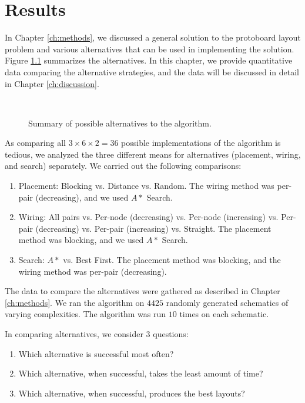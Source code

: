 
\chapter{Results}
\label{ch:results}

In Chapter \ref{ch:methods}, we discussed a general solution to the protoboard
layout problem and various alternatives that can be used in implementing the
solution. Figure \ref{fig:alternatives} summarizes the alternatives.
In this chapter, we provide quantitative data comparing the alternative
strategies, and the data will be discussed in detail in Chapter
\ref{ch:discussion}.

\begin{figure}[H]
\centering
{}
\\
\label{fig:alternatives}
\caption[Algorithm alternatives summary]{Summary of possible alternatives
to the algorithm.}
\end{figure}

As comparing all $3 \times 6 \times 2 = 36$ possible implementations of the
algorithm is tedious,
we analyzed the three different means for alternatives (placement, wiring, and
search) separately. We carried out the following comparisons:

\begin{enumerate}
\item Placement: Blocking vs. Distance vs. Random. The wiring method was per-pair
(decreasing), and we used $A*$ Search.
\item Wiring: All pairs vs. Per-node (decreasing) vs. Per-node (increasing) vs.
Per-pair (decreasing) vs. Per-pair (increasing) vs. Straight.
The placement method was blocking, and we used $A*$ Search.
\item Search: $A*$ vs. Best First. The placement method was blocking, and the
wiring method was per-pair (decreasing).
\end{enumerate}

The data to compare the alternatives were gathered as described in Chapter
\ref{ch:methods}. We ran the algorithm on $4425$ randomly generated schematics
of varying complexities. The algorithm was run $10$ times on each schematic.

In comparing alternatives, we consider $3$ questions:
\begin{enumerate}
\item Which alternative is successful most often?
\item Which alternative, when successful, takes the least amount of time?
\item Which alternative, when successful, produces the best layouts?
\end{enumerate}

